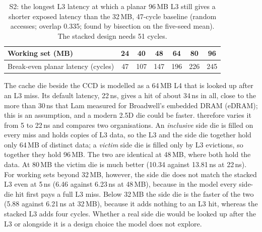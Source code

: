 \begin{table}[htbp]
  \centering
  \caption[S2: the slowest planar 96\,MB L3 that still beats the baseline]{S2: the longest L3 latency at which a planar 96\,MB L3 still gives a shorter exposed latency than the 32\,MB, 47-cycle baseline (random accesses; overlap 0.335; found by bisection on the five-seed mean). The stacked design needs 51 cycles.}
  \label{tab:sim-planar}
  \small
  \begin{tabular}{@{}lcccccc@{}}
    \toprule
    \textbf{Working set (MB)} & 24 & 40 & 48 & 64 & 80 & 96 \\
    \midrule
    Break-even planar latency (cycles) & 47 & 107 & 147 & 196 & 226 & 245 \\
    \bottomrule
  \end{tabular}
\end{table}

The cache die beside the CCD is modelled as a 64\,MB L4 that is looked up after an L3 miss. Its default latency, 22\,ns, gives a hit of about 34\,ns in all, close to the more than 30\,ns that Lam measured for Broadwell's embedded DRAM (eDRAM); this is an assumption, and a modern 2.5D die could be faster.  therefore varies it from 5 to 22\,ns and compares two organisations. An \emph{inclusive} side die is filled on every miss and holds copies of L3 data, so the L3 and the side die together hold only 64\,MB of distinct data; a \emph{victim} side die is filled only by L3 evictions, so together they hold 96\,MB. The two are identical at 48\,MB, where both hold the data. At 80\,MB the victim die is much better (10.34 against 13.81\,ns at 22\,ns). For working sets beyond 32\,MB, however, the side die does not match the stacked L3 even at 5\,ns (6.46 against 6.23\,ns at 48\,MB), because in the model every side-die hit first pays a full L3 miss. Below 32\,MB the side die is the faster of the two (5.88 against 6.21\,ns at 32\,MB), because it adds nothing to an L3 hit, whereas the stacked L3 adds four cycles. Whether a real side die would be looked up after the L3 or alongside it is a design choice the model does not explore.

